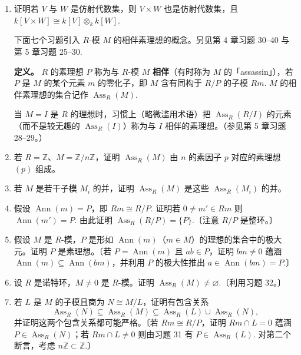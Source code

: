 \begin{enumerate}
\item 证明若 \(V\) 与 \(W\) 是仿射代数集，则 \(V \times W\) 也是仿射代数集，且 \(k[V \times W] \cong k[V] \otimes_k k[W]\).

\noindent 下面七个习题引入 \(R\)-模 \(M\) 的相伴素理想的概念。另见第 4 章习题 30--40 与第 5 章习题 25--30.

\noindent\textbf{定义。} \(R\) 的素理想 \(P\) 称为与 \(R\)-模 \(M\) \textbf{相伴}（有时称为 \(M\) 的「assassin」），若 \(P\) 是 \(M\) 的某个元素 \(m\) 的零化子，即 \(M\) 含有同构于 \(R/P\) 的子模 \(Rm\). \(M\) 的相伴素理想的集合记作 \(\operatorname{Ass}_R(M)\).

当 \(M = I\) 是 \(R\) 的理想时，习惯上（略微滥用术语）把 \(\operatorname{Ass}_R(R/I)\) 的元素（而不是较无趣的 \(\operatorname{Ass}_R(I)\)）称为与 \(I\) 相伴的素理想。（参见第 5 章习题 28--29。）

\item 若 \(R = \mathbb{Z}\)、\(M = \mathbb{Z}/n\mathbb{Z}\)，证明 \(\operatorname{Ass}_R(M)\) 由 \(n\) 的素因子 \(p\) 对应的素理想 \((p)\) 组成。

\item 若 \(M\) 是若干子模 \(M_i\) 的并，证明 \(\operatorname{Ass}_R(M)\) 是这些 \(\operatorname{Ass}_R(M_i)\) 的并。

\item 假设 \(\operatorname{Ann}(m) = P\)，即 \(Rm \cong R/P\). 证明若 \(0 \neq m' \in Rm\) 则 \(\operatorname{Ann}(m') = P\). 由此证明 \(\operatorname{Ass}_R(R/P) = \{P\}\).〔注意 \(R/P\) 是整环。〕

\item 假设 \(M\) 是 \(R\)-模，\(P\) 是形如 \(\operatorname{Ann}(m)\)（\(m \in M\)）的理想的集合中的极大元。证明 \(P\) 是素理想。〔若 \(P = \operatorname{Ann}(m)\) 且 \(ab \in P\)，证明 \(bm \neq 0\) 蕴涵 \(\operatorname{Ann}(m) \subseteq \operatorname{Ann}(bm)\)，并利用 \(P\) 的极大性推出 \(a \in \operatorname{Ann}(bm) = P\).〕

\item 设 \(R\) 是诺特环，\(M \neq 0\) 是 \(R\)-模。证明 \(\operatorname{Ass}_R(M) \neq \varnothing\).〔利用习题 32。〕

\item 若 \(L\) 是 \(M\) 的子模且商为 \(N \cong M/L\)，证明有包含关系
\[
\operatorname{Ass}_R(N) \subseteq \operatorname{Ass}_R(M) \subseteq \operatorname{Ass}_R(L) \cup \operatorname{Ass}_R(N),
\]
并证明这两个包含关系都可能严格。〔若 \(Rm \cong R/P\)，证明 \(Rm \cap L = 0\) 蕴涵 \(P \in \operatorname{Ass}_R(N)\)；若 \(Rm \cap L \neq 0\) 则由习题 31 有 \(P \in \operatorname{Ass}_R(L)\). 对第二个断言，考虑 \(n\mathbb{Z} \subset \mathbb{Z}\).〕


\end{enumerate}
